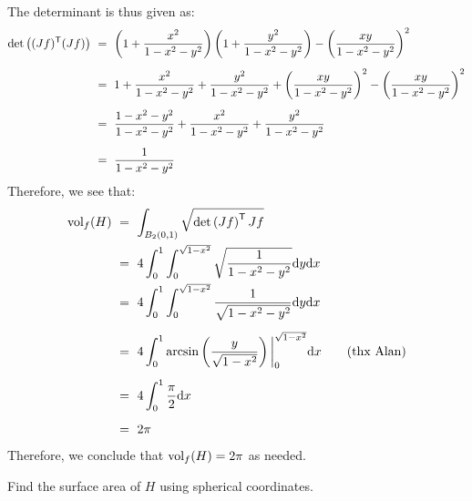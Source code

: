 \documentclass{article}
\begin{document}
\begin{soln}
\begin{align*}
    \end{align*}
    The determinant is thus given as:
    \begin{align*}
        \det \left( (Jf)^{\msf{T}}(Jf) \right) & \ = \
        \left( 1 + \frac{x^{2}}{1-x^{2}-y^{2}} \right)
        \left( 1 + \frac{y^{2}}{1-x^{2}-y^{2}} \right) -
        \left( \frac{xy}{1-x^{2}-y^{2}} \right)^{2} \vsp
        & \ = \
        1 + \frac{x^{2}}{1-x^{2}-y^{2}} + \frac{y^{2}}{1-x^{2}-y^{2}} +
        \left( \frac{xy}{1-x^{2}-y^{2}} \right)^{2} -
        \left( \frac{xy}{1-x^{2}-y^{2}} \right)^{2} \vsp
        & \ = \
        \frac{1-x^{2}-y^{2}}{1-x^{2}-y^{2}} +
        \frac{x^{2}}{1-x^{2}-y^{2}} + \frac{y^{2}}{1-x^{2}-y^{2}} \vsp
        & \ = \ \frac{1}{1-x^{2}-y^{2}}
    \end{align*}
    Therefore, we see that:
    \begin{align*}
        \trm{vol}_{f}(H) & \ = \ \int_{B_{2}(0,1)} \sqrt{\det \left( Jf \right)^{\msf{T}}Jf} \\
                         & \ = \ 4\int_{0}^{1}\int_{0}^{\sqrt{1-x^{2}}}
                         \sqrt{\frac{1}{1-x^{2}-y^{2}}}\d y\d x \\
                         & \ = \ 4\int_{0}^{1}\int_{0}^{\sqrt{1-x^{2}}}
                         \frac{1}{\sqrt{1-x^{2}-y^{2}}}\d y\d x \vsp
                         & \ = \ 4\int_{0}^{1}\arcsin \left( \frac{y}{\sqrt{1-x^{2}}}
                         \right)\bigg\rvert_{0}^{\sqrt{1-x^{2}}}\d x
                         \tag*{(thx Alan)}\vsp
                         & \ = \ 4\int_{0}^{1} \frac{\pi}{2}\d x \vsp
                         & \ = \ 2\pi
    \end{align*}
    Therefore, we conclude that $ \textrm{vol}_{f}(H) = 2\pi $ as needed.
\end{soln}


\setcounter{qu}{9}
\begin{qu}[title=Part b)]
    Find the surface area of $H$ using spherical coordinates.
\end{qu}
\end{document}
